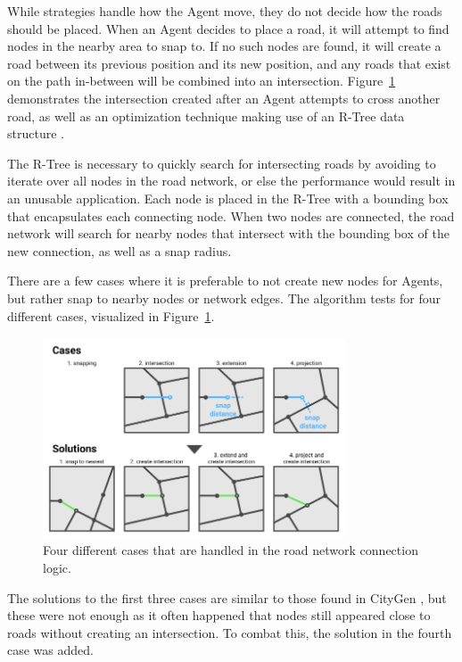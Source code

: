 
While strategies handle how the Agent move, they do not decide how the roads should be placed.
When an Agent decides to place a road, it will attempt to find nodes in the nearby area to snap to.
If no such nodes are found, it will create a road between its previous position and its new position, and any roads that exist on the path in-between will be combined into an intersection.
Figure~\ref{fig:road_connection_cases} demonstrates the intersection created after an Agent attempts to cross another road, as well as an optimization technique making use of an R-Tree data structure \citetodo{}.

The R-Tree is necessary to quickly search for intersecting roads by avoiding to iterate over all nodes in the road network, or else the performance would result in an unusable application.
Each node is placed in the R-Tree with a bounding box that encapsulates each connecting node.
When two nodes are connected, the road network will search for nearby nodes that intersect with the bounding box of the new connection, as well as a snap radius.

There are a few cases where it is preferable to not create new nodes for Agents, but rather snap to nearby nodes or network edges.
The algorithm tests for four different cases, visualized in Figure~\ref{fig:road_connection_cases}.

\begin{figure}[H]
  \centering

  \includegraphics[width=0.8\textwidth]{figure/road_connection_cases.png}
  \caption{Four different cases that are handled in the road network connection logic.}

  \label{fig:road_connection_cases}
\end{figure}

The solutions to the first three cases are similar to those found in CityGen \citetodo{}, but these were not enough as it often happened that nodes still appeared close to roads without creating an intersection. %
To combat this, the solution in the fourth case was added.

